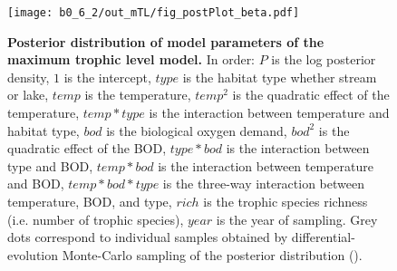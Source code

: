 \documentclass[11pt, oneside]{article}
\begin{document}
\begin{figure}[H]
\begin{center}
\texttt{[image: b0\_6\_2/out\_mTL/fig\_postPlot\_beta.pdf]}
\caption{
    \textbf{Posterior distribution of model parameters of the maximum trophic level model.}
    In order: $P$ is the log posterior density, $1$ is the intercept, $type$ is the habitat type whether stream or lake, $temp$ is the temperature, $temp^2$ is the quadratic effect of the temperature, $temp * type$ is the interaction between temperature and habitat type, $bod$ is the biological oxygen demand, $bod^2$ is the quadratic effect of the BOD, $type * bod$ is the interaction between type and BOD, $temp * bod$ is the interaction between temperature and BOD, $temp * bod * type$ is the three-way interaction between temperature, BOD, and type, $rich$ is the trophic species richness (i.e. number of trophic species), $year$ is the year of sampling.
    Grey dots correspond to individual samples obtained by differential-evolution Monte-Carlo sampling of the posterior distribution (\cite{TerBraak2006}). 
} 
\end{center}
\end{figure}
\end{document}
